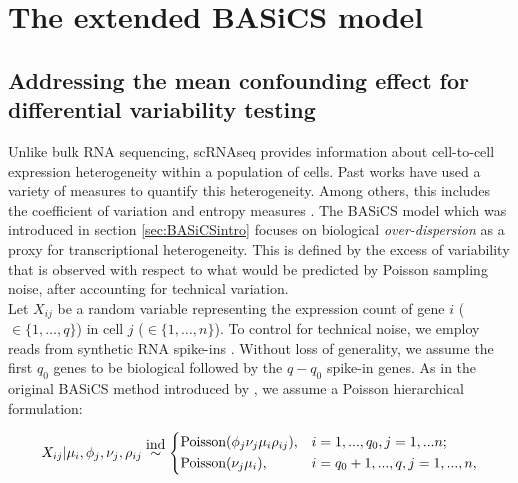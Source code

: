 
\section{The extended BASiCS model}
\subsection*{Addressing the mean confounding effect for differential variability testing}


Unlike bulk RNA sequencing, scRNAseq provides information about cell-to-cell expression heterogeneity within a population of cells. Past works have used a variety of measures to quantify this heterogeneity. Among others, this includes the coefficient of variation \citep[CV,][]{Brennecke2013} and entropy measures \citep{Richard2016}. The BASiCS model \citep{Vallejos2015BASiCS, Vallejos2016} which was introduced in section \ref{sec:BASiCSintro} focuses on biological {\it over-dispersion} as a proxy for transcriptional heterogeneity. This is defined by the excess of variability that is observed with respect to what would be predicted by Poisson sampling noise, after accounting for technical variation. \\ 

Let $X_{ij}$ be a random variable representing the expression count of gene $i$ ($ \in \{1, \ldots, q\}$) in cell $j$ ($\in \{ 1, \ldots ,n\}$). 
To control for technical noise, we employ reads from synthetic RNA spike-ins \citep[e.g.~those introduced by][]{Jiang2011}. Without loss of generality, we assume the first $q_0$ genes to be biological followed by the $q-q_0$ spike-in genes. As in the original BASiCS method introduced by \cite{Vallejos2015BASiCS}, we assume a Poisson hierarchical formulation: 

\begin{equation} \label{eq::PoissonBASiCS}
 X_{ij}|\mu_i,\phi_j,\nu_j,\rho_{ij} \stackrel{\mbox{ind}}{\sim}
 \left\lbrace
  \begin{aligned}
    &\textnormal{Poisson}(\phi_j\nu_j\mu_i\rho_{ij}), && i=1,...,q_0,j=1,...n;  \\ 
    &\textnormal{Poisson}(\nu_j\mu_i), && i=q_0+1,...,q,j=1,...,n,    	    
  \end{aligned}
\right.
\end{equation} 

